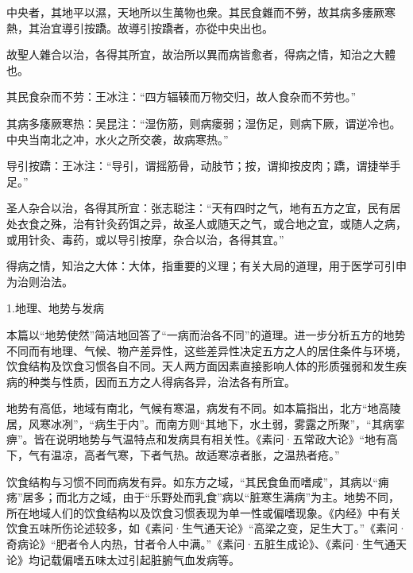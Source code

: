 \documentclass[draft,12pt]{ctexbook}
\begin{document}

\begin{yuanwen}
中央者，其地平以濕，天地所以生萬物也衆。其民食雜而不勞，故其病多痿厥寒熱，其治宜導引按蹻。故導引按蹻者，亦從中央出也。

故聖人雜合以治，各得其所宜，故治所以異而病皆愈者，得病之情，知治之大體也。
\end{yuanwen}


\begin{jiaozhu}
	\item 其民食杂而不劳：王冰注：“四方辐辏而万物交归，故人食杂而不劳也。”
	\item 其病多痿厥寒热：吴昆注：“湿伤筋，则病瘘弱；湿伤足，则病下厥，谓逆冷也。中央当南北之冲，水火之所交袭，故病寒热。”
	\item 导引按蹻：王冰注：“导引，谓摇筋骨，动肢节；按，谓抑按皮肉；蹻，谓捷举手足。”
	\item 圣人杂合以治，各得其所宜：张志聪注：“天有四时之气，地有五方之宜，民有居处衣食之殊，治有针灸药饵之异，故圣人或随天之气，或合地之宜，或随人之病，或用针灸、毒药，或以导引按摩，杂合以治，各得其宜。”
	\item 得病之情，知治之大体：大体，指重要的义理；有关大局的道理，用于医学可引申为治则治法。
\end{jiaozhu}


1.地理、地势与发病

本篇以“地势使然”简洁地回答了“一病而治各不同”的道理。进一步分析五方的地势不同而有地理、气候、物产差异性，这些差异性决定五方之人的居住条件与环境，饮食结构及饮食习惯各自不同。天人两方面因素直接影响人体的形质强弱和发生疾病的种类与性质，因而五方之人得病各异，治法各有所宜。

地势有高低，地域有南北，气候有寒温，病发有不同。如本篇指出，北方“地高陵居，风寒冰冽”，“病生于内”。而南方则“其地下，水土弱，雾露之所聚”，“其病挛痹”。皆在说明地势与气温特点和发病具有相关性。《素问·五常政大论》“地有高下，气有温凉，高者气寒，下者气热。故适寒凉者胀，之温热者疮。”

饮食结构与习惯不同而病发有异。如东方之域，“其民食鱼而嗜咸”，其病以“痈疡”居多；而北方之域，由于“乐野处而乳食”病以“脏寒生满病”为主。地势不同，所在地域人们的饮食结构以及饮食习惯表现为单一性或偏嗜现象。《内经》中有关饮食五味所伤论述较多，如《素问·生气通天论》“高梁之变，足生大丁。”《素问·奇病论》“肥者令人内热，甘者令人中满。”《素问·五脏生成论》、《素问·生气通天论》均记载偏嗜五味太过引起脏腑气血发病等。
\end{document}
